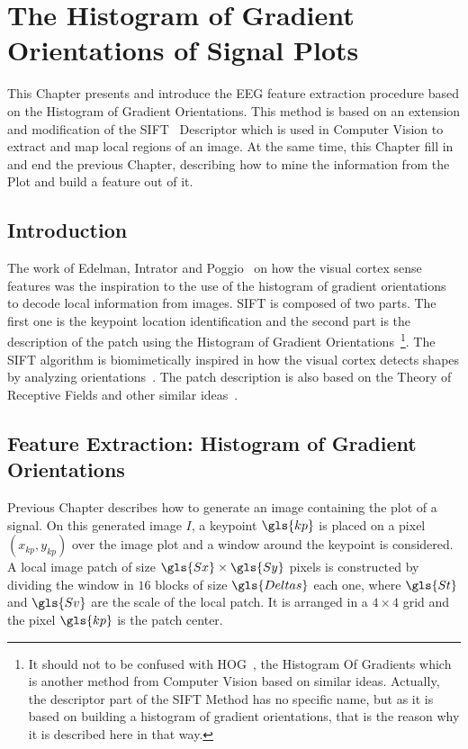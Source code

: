 \chapter{The Histogram of Gradient Orientations of Signal Plots}
\label{chapter:three}

This Chapter presents and introduce the EEG feature extraction procedure based on the Histogram of Gradient Orientations.  This method is based on an extension and modification of the SIFT~\cite{Lowe2004} Descriptor which is used in Computer Vision to extract and map local regions of an image.  At the same time, this Chapter fill in and end the previous Chapter, describing how to mine the information from the Plot and build a feature out of it.

\section{Introduction}


The work of Edelman, Intrator and Poggio~\cite{cogprints561} on how the visual cortex sense features was the inspiration to the use of the histogram of gradient orientations to decode local information from images.  SIFT is composed of two parts.  The first one is the keypoint location identification and the second part is the description of the patch using the Histogram of Gradient Orientations~\footnote{It should not to be confused with HOG~\cite{Dalal2005}, the Histogram Of Gradients which is another method from Computer Vision based on similar ideas.  Actually, the descriptor part of the SIFT Method has no specific name, but as it is based on building a histogram of gradient orientations, that is the reason why it is described here in that way. }.  The SIFT algorithm is biomimetically inspired in how the visual cortex detects shapes by analyzing orientations~\cite{cogprints561}.  The patch description is also based on the Theory of Receptive Fields and other similar ideas~\cite{Lindeberg2013}.

\section{Feature Extraction: Histogram of Gradient Orientations}
\label{SIFT}

Previous Chapter describes how to generate an image containing the plot of a signal.  On this generated image $I$, a keypoint $\gls{kp}$ is placed on a pixel $(x_{kp}, y_{kp})$ over the image plot and a window around the keypoint is considered. A local image patch of size $\gls{Sx} \times \gls{Sy}$ pixels is constructed by dividing the window in $16$ blocks of size $\gls{Deltas}$ each one,  where $\gls{St}$  and $\gls{Sv}$ are the scale of the local patch. It is arranged in a $4 \times 4$ grid and the pixel $\gls{kp}$ is the patch center. 

